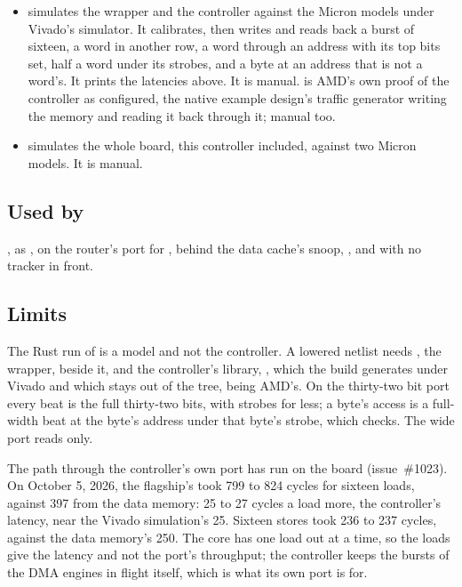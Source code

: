 \begin{itemize}
, a compiled program that
writes and reads the memory through the model and must print
. It also runs \allowbreak
{},
and , which finds a load
from the memory costing the model's read latency less two cycles more
than a load from the data memory.
\allowbreak
{} there relies on the
model reading at the address: a cache fill that is out when another
host's write lands brings the old word, and the core must not keep it
(issues 1424 and 1429).
\item {} simulates the wrapper and the
controller against the Micron models under Vivado's simulator. It
calibrates, then writes and reads back a burst of sixteen, a word in
another row, a word through an address with its top bits set, half a
word under its strobes, and a byte at an address that is not a
word's. It prints the latencies above. It is manual.
 is AMD's own proof of the controller as
configured, the native example design's traffic generator writing the
memory and reading it back through it; manual too.
\item {}\allowbreak
{} simulates the whole
board, this controller included, against two Micron models. It is
manual.
\end{itemize}

\subsection*{Used by}

, as , on the router's port for
, behind the data cache's snoop, ,
and with no tracker in front.

\subsection*{Limits}

The Rust run of  is a model and not the controller. A
lowered netlist needs , the wrapper, beside it, and
the controller's library, , which the build
generates under Vivado and which stays out of the tree, being AMD's.
On the thirty-two bit port every beat is the full thirty-two bits,
with strobes for less; a byte's access is a full-width beat at the
byte's address under that byte's strobe, which 
checks. The wide port reads only.

The path through the controller's own port has run on the board
(issue~\#1023). On October 5, 2026, the flagship's
 took 799 to 824 cycles for sixteen loads,
against 397 from the data memory: 25 to 27 cycles a load more, the
controller's latency, near the Vivado simulation's 25. Sixteen stores
took 236 to 237 cycles, against the data memory's 250. The core has one
load out at a time, so the loads give the latency and not the port's
throughput; the controller keeps the bursts of the DMA engines in
flight itself, which is what its own port is for.
